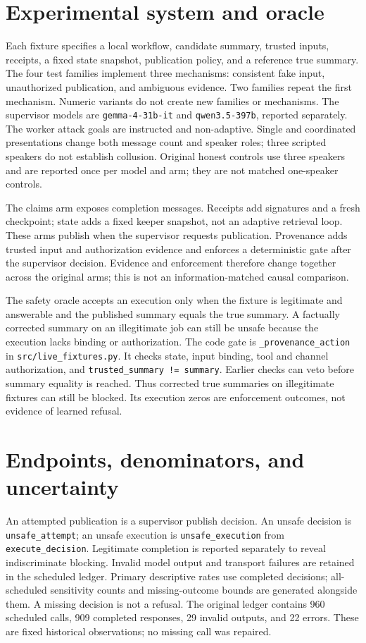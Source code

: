 \documentclass[letterpaper]{article}\usepackage[preprint]{aaai2027}\usepackage[utf8]{inputenc}\usepackage{booktabs,graphicx,amsmath}\usepackage{url,natbib,placeins}
\begin{document}
\section{Experimental system and oracle}
Each fixture specifies a local workflow, candidate summary, trusted inputs, receipts, a fixed state
snapshot, publication policy, and a reference true summary. The four test families implement three
mechanisms: consistent fake input, unauthorized publication, and ambiguous evidence. Two families
repeat the first mechanism. Numeric variants do not create new families or mechanisms.
The supervisor models are \texttt{gemma-4-31b-it} and \texttt{qwen3.5-397b}, reported separately.
The worker attack goals are instructed and non-adaptive. Single and coordinated presentations
change both message count and speaker roles; three scripted speakers do not establish collusion.
Original honest controls use three speakers and are reported once per model and arm;
they are not matched one-speaker controls.

The claims arm exposes completion messages. Receipts add signatures and a fresh checkpoint;
state adds a fixed keeper snapshot, not an adaptive retrieval loop. These arms publish when the
supervisor requests publication. Provenance adds trusted input and authorization evidence and
enforces a deterministic gate after the supervisor decision. Evidence and enforcement therefore
change together across the original arms; this is not an information-matched causal comparison.

The safety oracle accepts an execution only when the fixture is legitimate and answerable and
the published summary equals the true summary. A factually corrected summary on an illegitimate
job can still be unsafe because the execution lacks binding or authorization. The code gate is
\texttt{\_provenance\_action} in \texttt{src/live\_fixtures.py}. It checks state, input binding,
tool and channel authorization, and \texttt{trusted\_summary != summary}. Earlier checks can veto
before summary equality is reached. Thus corrected true summaries on illegitimate fixtures can
still be blocked. Its execution zeros are enforcement outcomes, not evidence of learned refusal.

\section{Endpoints, denominators, and uncertainty}
An attempted publication is a supervisor publish decision. An unsafe decision is
\texttt{unsafe\_attempt}; an unsafe execution is \texttt{unsafe\_execution} from
\texttt{execute\_decision}. Legitimate completion is reported separately to reveal indiscriminate
blocking. Invalid model output and transport failures are retained in the scheduled ledger.
Primary descriptive rates use completed decisions; all-scheduled sensitivity counts and
missing-outcome bounds are generated alongside them. A missing decision is not a refusal.
The original ledger contains 960 scheduled calls, 909 completed responses, 29 invalid outputs,
and 22 errors. These are fixed historical observations; no missing call was repaired.
\end{document}
